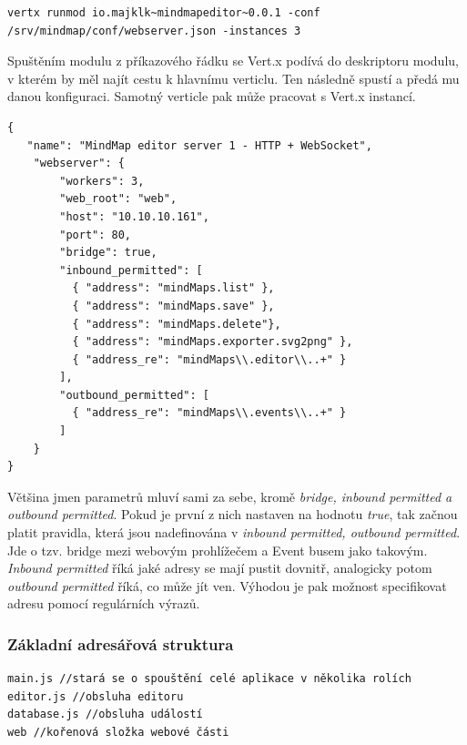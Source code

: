 \begin{lstlisting}[caption=Spuštění modulu z příkazové řádky]
vertx runmod io.majklk~mindmapeditor~0.0.1 -conf /srv/mindmap/conf/webserver.json -instances 3
\end{lstlisting}

Spuštěním modulu z příkazového řádku se Vert.x podívá do deskriptoru modulu, v kterém by měl najít cestu k hlavnímu verticlu. Ten následně spustí a předá mu danou konfiguraci. Samotný verticle pak může pracovat s Vert.x instancí.

\begin{lstlisting}[caption=Konfigurace serveru 1]
{
   "name": "MindMap editor server 1 - HTTP + WebSocket",
    "webserver": {
        "workers": 3,
        "web_root": "web",
        "host": "10.10.10.161",
        "port": 80,
        "bridge": true,
        "inbound_permitted": [
          { "address": "mindMaps.list" },
          { "address": "mindMaps.save" },
          { "address": "mindMaps.delete"},
          { "address": "mindMaps.exporter.svg2png" },
          { "address_re": "mindMaps\\.editor\\..+" }
        ],
        "outbound_permitted": [
          { "address_re": "mindMaps\\.events\\..+" }
        ]
    }
}
\end{lstlisting}

Většina jmen parametrů mluví sami za sebe, kromě \emph{bridge, inbound permitted a outbound permitted}. Pokud je první z nich nastaven na hodnotu \emph{true}, tak začnou platit pravidla, která jsou nadefinována v \emph{inbound permitted, outbound permitted}. Jde o tzv. bridge mezi webovým prohlížečem a Event busem jako takovým. \emph{Inbound permitted} říká jaké adresy se mají pustit dovnitř, analogicky potom \emph{outbound permitted} říká, co může jít ven. Výhodou je pak možnost specifikovat adresu pomocí regulárních výrazů.

\subsubsection{Základní adresářová struktura}

\begin{lstlisting}
main.js //stará se o spouštění celé aplikace v několika rolích
editor.js //obsluha editoru
database.js //obsluha událostí 
web //kořenová složka webové části
\end{lstlisting}

